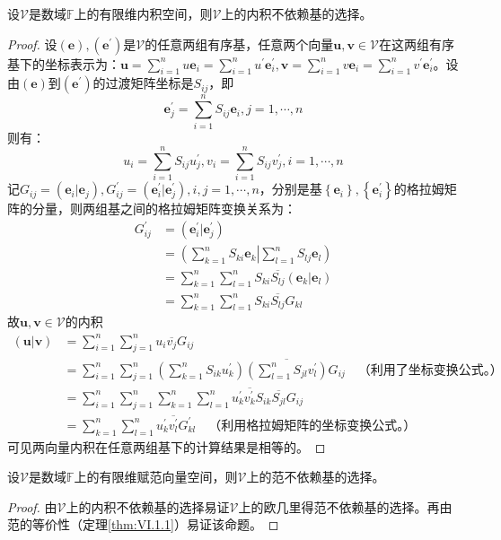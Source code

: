\documentclass[main.tex]{subfiles}
\begin{document}
\begin{theorem}\label{thm:II.5.3}
设$\mathcal{V}$是数域$\mathbb{F}$上的有限维内积空间，则$\mathcal{V}$上的内积不依赖基的选择。
\end{theorem}
\begin{proof}
设$\left(\mathbf{e}\right),\left(\mathbf{e}^\prime\right)$是$\mathcal{V}$的任意两组有序基，任意两个向量$\mathbf{u},\mathbf{v}\in\mathcal{V}$在这两组有序基下的坐标表示为：$\mathbf{u}=\sum_{i=1}^nu\mathbf{e}_i=\sum_{i=1}^nu^\prime\mathbf{e}^\prime_i,\mathbf{v}=\sum_{i=1}^nv\mathbf{e}_i=\sum_{i=1}^nv^\prime\mathbf{e}^\prime_i$。设由$\left(\mathbf{e}\right)$到$\left(\mathbf{e}^\prime\right)$的过渡矩阵坐标是$S_{ij}$，即
\[
\mathbf{e}_j^\prime=\sum_{i=1}^nS_{ij}\mathbf{e}_i,j=1,\cdots,n\]
则有：
\[u_i=\sum_{i=1}^nS_{ij}u^\prime_j,v_i=\sum_{i=1}^nS_{ij}v^\prime_j,i=1,\cdots,n\]
记$G_{ij}=\left(\mathbf{e}_i|\mathbf{e}_j\right),G_{ij}^\prime=\left(\mathbf{e}^\prime_i|\mathbf{e}^\prime_j\right),i,j=1,\cdots,n$，分别是基$\left\{\mathbf{e}_i\right\},\left\{\mathbf{e}^\prime_i\right\}$的格拉姆矩阵的分量，则两组基之间的格拉姆矩阵变换关系为：
\begin{align*}
    G^\prime_{ij}&=\left(\mathbf{e}^\prime_i|\mathbf{e}^\prime_j\right)\\
    &=\left(\sum_{k=1}^n S_{ki}\mathbf{e}_k\right|\left.\sum_{l=1}^n S_{lj}\mathbf{e}_l\right)\\
    &=\sum_{k=1}^n\sum_{l=1}^nS_{ki}\overline{S_{lj}}\left(\mathbf{e}_k|\mathbf{e}_l\right)\\
    &=\sum_{k=1}^n\sum_{l=1}^nS_{ki}\overline{S_{lj}}G_{kl}
\end{align*}
故$\mathbf{u},\mathbf{v}\in\mathcal{V}$的内积
\begin{align*}
    \left(\mathbf{u}|\mathbf{v}\right)&=\sum_{i=1}^n\sum_{j=1}^nu_i\overline{v_j}G_{ij}\\
    &=\sum_{i=1}^n\sum_{j=1}^n\left(\sum_{k=1}^nS_{ik}u_k^\prime\right)\overline{\left(\sum_{l=1}^nS_{jl}v_l^\prime\right)}G_{ij}\quad\text{（利用了坐标变换公式。）}\\
    &=\sum_{i=1}^n\sum_{j=1}^n\sum_{k=1}^n\sum_{l=1}^nu_k^\prime\overline{v_k^\prime}S_{ik}\overline{S_{jl}}G_{ij}\\
    &=\sum_{k=1}^n\sum_{l=1}^nu_k^\prime\overline{v_l^\prime}G_{kl}^\prime\quad\text{（利用格拉姆矩阵的坐标变换公式。）}
\end{align*}
可见两向量内积在任意两组基下的计算结果是相等的。
\end{proof}
\begin{corollary}
设$\mathcal{V}$是数域$\mathbb{F}$上的有限维赋范向量空间，则$\mathcal{V}$上的范不依赖基的选择。
\end{corollary}
\begin{proof}
由$\mathcal{V}$上的内积不依赖基的选择易证$\mathcal{V}$上的欧几里得范不依赖基的选择。再由范的等价性（定理\ref{thm:VI.1.1}）易证该命题。
\end{proof}
\end{document}
